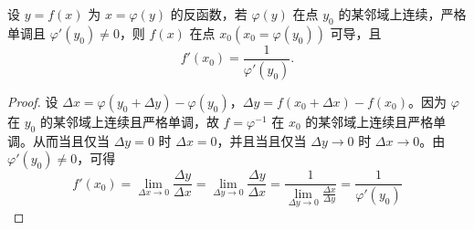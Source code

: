 \documentclass[../../main.tex]{subfiles}
\begin{document}
\begin{theorem}[反函数求导定理]\label{theorem:反函数求导定理}
设 \( y = f(x) \) 为 \( x = \varphi(y) \) 的反函数，若 \( \varphi(y) \) 在点 \( y_0 \) 的某邻域上连续，严格单调且 \( \varphi'(y_0) \neq 0 \)，则 \( f(x) \) 在点 \( x_0 (x_0 = \varphi(y_0)) \) 可导，且
\[
f'(x_0) = \frac{1}{\varphi'(y_0)}.
\]
\end{theorem}
\begin{proof}
设 \( \Delta x = \varphi(y_0 + \Delta y) - \varphi(y_0) \)，\( \Delta y = f(x_0 + \Delta x) - f(x_0) \)。因为 \( \varphi \) 在 \( y_0 \) 的某邻域上连续且严格单调，故 \( f = \varphi^{-1} \) 在 \( x_0 \) 的某邻域上连续且严格单调。从而当且仅当 \( \Delta y = 0 \) 时 \( \Delta x = 0 \)，并且当且仅当 \( \Delta y \to 0 \) 时 \( \Delta x \to 0 \)。由 \( \varphi'(y_0) \neq 0 \)，可得
\[
f'(x_0) = \lim_{\Delta x \to 0} \frac{\Delta y}{\Delta x} = \lim_{\Delta y \to 0} \frac{\Delta y}{\Delta x} = \frac{1}{\lim_{\Delta y \to 0} \frac{\Delta x}{\Delta y}} = \frac{1}{\varphi'(y_0)}
\]
\end{proof}
\end{document}

